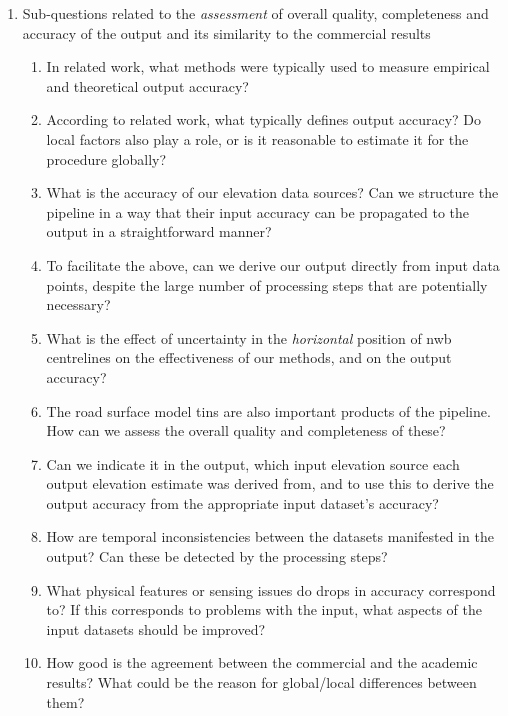 \begin{enumerate}
    \item Sub-questions related to the \textit{assessment} of overall quality, completeness and accuracy of the output and its similarity to the commercial results
    \begin{enumerate}
        \item In related work, what methods were typically used to measure empirical and theoretical output accuracy?
        \item According to related work, what typically defines output accuracy? Do local factors also play a role, or is it reasonable to estimate it for the procedure globally?
        \item What is the accuracy of our elevation data sources? Can we structure the pipeline in a way that their input accuracy can be propagated to the output in a straightforward manner?
        \item To facilitate the above, can we derive our output directly from input data points, despite the large number of processing steps that are potentially necessary?
        \item What is the effect of uncertainty in the \textit{horizontal} position of \ac{nwb} centrelines on the effectiveness of our methods, and on the output accuracy?
        \item The road surface model \ac{tin}s are also important products of the pipeline. How can we assess the overall quality and completeness of these?
        \item Can we indicate it in the output, which input elevation source each output elevation estimate was derived from, and to use this to derive the output accuracy from the appropriate input dataset's accuracy?
        \item How are temporal inconsistencies between the datasets manifested in the output? Can these be detected by the processing steps?
        \item What physical features or sensing issues do drops in accuracy correspond to? If this corresponds to problems with the input, what aspects of the input datasets should be improved?
        \item How good is the agreement between the commercial and the academic results? What could be the reason for global/local differences between them?
    \end{enumerate}
\end{enumerate}